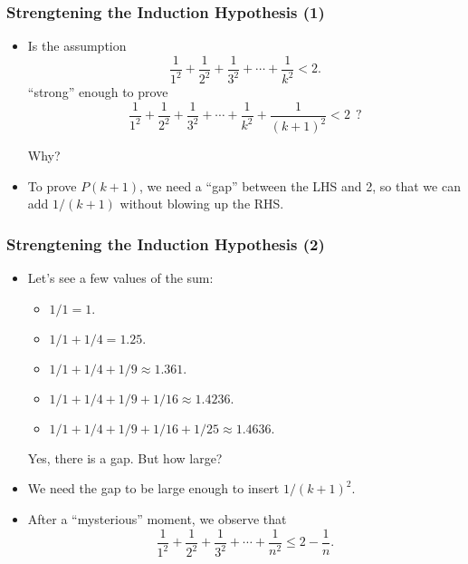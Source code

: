 \begin{frame}\frametitle{Strengtening the Induction Hypothesis (1)}
  \begin{itemize}
  \item
    Is the assumption
    \[ \frac{1}{1^2} + \frac{1}{2^2} + \frac{1}{3^2} + \cdots +\frac{1}{k^2} < 2.\]
    ``strong'' enough to prove
    \[ \frac{1}{1^2} + \frac{1}{2^2} + \frac{1}{3^2} + \cdots +\frac{1}{k^2}+\frac{1}{(k+1)^2} < 2 \ \ ?\]

    Why?
    \pause
    
  \item To prove $P(k+1)$, we need a ``gap'' between the LHS and 2, so
    that we can add $1/(k+1)$ without blowing up the RHS.
  \end{itemize}
\end{frame}

\begin{frame}\frametitle{Strengtening the Induction Hypothesis (2)}
  \begin{itemize}
  \item Let's see a few values of the sum:
    \begin{itemize}
    \item $1/1 = 1.$ \pause
    \item $1/1 + 1/4 = 1.25.$ \pause
    \item $1/1 + 1/4 + 1/9 \approx 1.361.$ \pause
    \item $1/1 + 1/4 + 1/9 + 1/16 \approx 1.4236.$ \pause
    \item $1/1 + 1/4 + 1/9 + 1/16 + 1/25 \approx 1.4636.$
    \end{itemize}
    Yes, there is a gap.  But how large?
    \pause
    
  \item We need the gap to be large enough to insert $1/(k+1)^2$.
    \pause
  \item After a ``mysterious'' moment, we observe that
    \[ \frac{1}{1^2} + \frac{1}{2^2} + \frac{1}{3^2} + \cdots +\frac{1}{n^2} \leq 2 - \frac{1}{n}.\]
  \end{itemize}
\end{frame}

